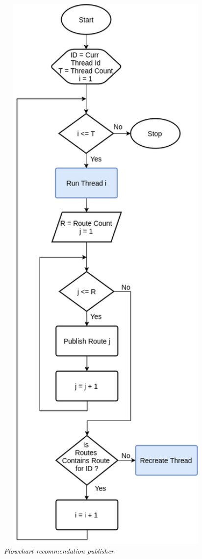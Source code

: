 \begin{figure}[!]
	\centering
	\includegraphics[width=11cm]{Resources/Images/recommendation-publisher}
	\caption{\textit{Flowchart recommendation publisher}}
	\label{fig:recommendation-publisher}
\end{figure}

